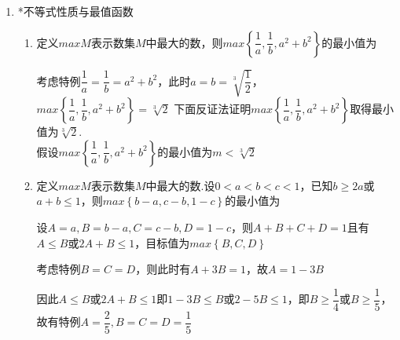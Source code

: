 \begin{enumerate}
\begin{enumerate}
\begin{jieda}
        \end{jieda}
    \end{enumerate}
    \item *不等式性质与最值函数
    \begin{enumerate}
        \item 定义$max M$表示数集$M$中最大的数，则$max\left\{\dfrac{1}{a}, \dfrac{1}{b}, a^2+b^2\right\}$的最小值为
        \begin{jieda}
            考虑特例$\dfrac{1}{a} = \dfrac{1}{b} = a^2+b^2$，此时$a = b = \sqrt[3]{\dfrac{1}{2}}$，$max\left\{\dfrac{1}{a}, \dfrac{1}{b}, a^2+b^2\right\} = \sqrt[3]{2}$ 下面反证法证明$max\left\{\dfrac{1}{a}, \dfrac{1}{b}, a^2+b^2\right\}$取得最小值为$\sqrt[3]{2}$. \\
            假设$max\left\{\dfrac{1}{a}, \dfrac{1}{b}, a^2+b^2\right\}$的最小值为$m < \sqrt[3]{2}$
        \end{jieda}
        \item 定义$max M$表示数集$M$中最大的数.设$0<a<b<c<1$，已知$b\geq 2a$或$a+b\leq 1$，则$max\left\{b-a, c-b, 1-c\right\}$的最小值为
        \begin{jieda}
            设$A = a, B = b-a, C = c - b, D = 1 - c$，则$A+B+C+D = 1$且有$A \leq B$或$2A+B \leq 1$，目标值为$max\left\{B, C, D\right\}$

            考虑特例$B = C = D$，则此时有$A+3B = 1$，故$A = 1-3B$
            
            因此$A \leq B$或$2A+B \leq 1$即$1-3B \leq B$或$2-5B \leq 1$，即$B \geq \dfrac{1}{4}$或$B \geq \dfrac{1}{5}$，故有特例$A = \dfrac{2}{5}, B = C = D = \dfrac{1}{5}$
            

\end{jieda}
\end{enumerate}
\end{enumerate}
